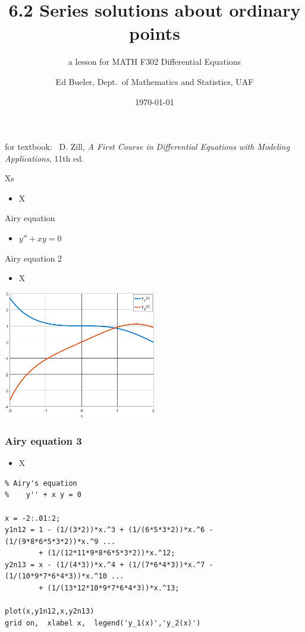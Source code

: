 \documentclass[urlcolor=blue,dvipsnames]{beamer}
\title{6.2 Series solutions about ordinary points}
\subtitle{a lesson for MATH F302 Differential Equations}
\author{Ed Bueler, Dept.~of Mathematics and Statistics, UAF}
\date{\tiny \today}
\begin{document}


\begin{frame}
\titlepage

\centerline{\tiny for textbook: \, D. Zill, \emph{A First Course in Differential Equations with Modeling Applications}, 11th ed.}
\end{frame}


\begin{frame}{Xs}

\begin{itemize}
\item X
\end{itemize}
\end{frame}


\begin{frame}{Airy equation}

\begin{itemize}
\item $y''+xy=0$
\end{itemize}
\end{frame}


\begin{frame}{Airy equation 2}

\begin{itemize}
\item X
\end{itemize}

\includegraphics[width=0.5\textwidth]{figs/airyplots}
\end{frame}


\begin{frame}[fragile]
\frametitle{Airy equation 3}

\begin{itemize}
\item X
\end{itemize}

\begin{Verbatim}[fontsize=\scriptsize]
% PLOTAIRY  Plot approximations to two linearly-independent solutions to
% Airy's equation
%    y'' + x y = 0

x = -2:.01:2;
y1n12 = 1 - (1/(3*2))*x.^3 + (1/(6*5*3*2))*x.^6 - (1/(9*8*6*5*3*2))*x.^9 ...
        + (1/(12*11*9*8*6*5*3*2))*x.^12;
y2n13 = x - (1/(4*3))*x.^4 + (1/(7*6*4*3))*x.^7 - (1/(10*9*7*6*4*3))*x.^10 ...
        + (1/(13*12*10*9*7*6*4*3))*x.^13;

plot(x,y1n12,x,y2n13)
grid on,  xlabel x,  legend('y_1(x)','y_2(x)')
\end{Verbatim}
\end{frame}
\end{document}
